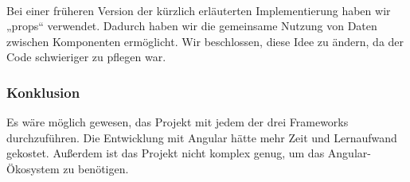 \paragraph{}
Bei einer früheren Version der kürzlich erläuterten Implementierung haben wir  „props“ verwendet. Dadurch haben wir die gemeinsame Nutzung von Daten zwischen Komponenten ermöglicht. Wir beschlossen, diese Idee zu ändern, da der Code schwieriger zu pflegen war.
\\

\subsubsection{Konklusion}
Es wäre möglich gewesen, das Projekt mit jedem der drei Frameworks durchzuführen.
Die Entwicklung mit Angular hätte mehr Zeit und Lernaufwand gekostet. Außerdem ist das Projekt nicht komplex genug, um das Angular-Ökosystem zu benötigen.
